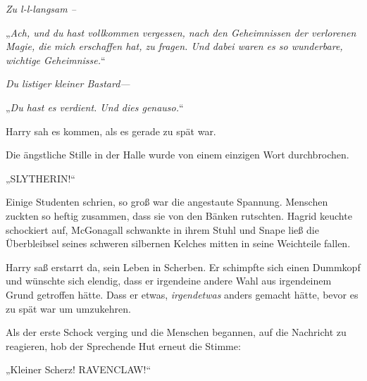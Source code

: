 \emph{Zu l-l-langsam – }

„\emph{Ach, und du hast vollkommen vergessen, nach den Geheimnissen der verlorenen Magie, die mich erschaffen hat, zu fragen. Und dabei waren es so wunderbare, wichtige Geheimnisse.}“

\emph{Du listiger kleiner \emph{Bastard}—}

„\emph{Du hast es verdient. Und dies genauso.}“

Harry sah es kommen, als es gerade zu spät war.

Die ängstliche Stille in der Halle wurde von einem einzigen Wort durchbrochen.

„SLYTHERIN!“

Einige Studenten schrien, so groß war die angestaute Spannung. Menschen zuckten so heftig zusammen, dass sie von den Bänken rutschten. Hagrid keuchte schockiert auf, McGonagall schwankte in ihrem Stuhl und Snape ließ die Überbleibsel seines schweren silbernen Kelches mitten in seine Weichteile fallen.

Harry saß erstarrt da, sein Leben in Scherben. Er schimpfte sich einen Dummkopf und wünschte sich elendig, dass er irgendeine andere Wahl aus irgendeinem Grund getroffen hätte. Dass er etwas, \emph{irgendetwas} anders gemacht hätte, bevor es zu spät war um umzukehren.

Als der erste Schock verging und die Menschen begannen, auf die Nachricht zu reagieren, hob der Sprechende Hut erneut die Stimme:

„Kleiner Scherz! RAVENCLAW!“

